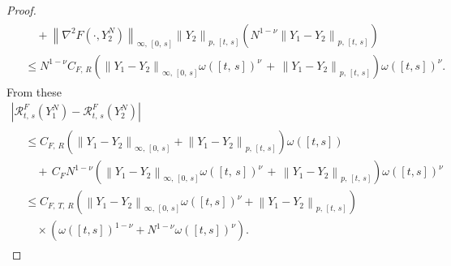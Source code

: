 \documentclass[10pt]{amsart}
\theoremstyle{definition}\newtheorem{defi}[theo]{Definition}\newtheorem{rema}[theo]{Remark}\newtheorem{exam}[theo]{Example}\newtheorem{exem}[theo]{Example}\newtheorem{nota}[theo]{Notation}
\newcommand{\calR}{\mathcal{R}}
\begin{document}
\begin{proof}
\begin{multline*}
\begin{aligned}
&\quad+\left\|\nabla^2 F\left(\cdot, Y^N_2\right)\right\|_{\infty,\,[0,\,s]} \left\|Y_2\right\|_{p,\, [t,\,s]} \left(N^{1-\nu}\left\|Y_1-Y_2\right\|_{p,\,[t,\,s]}\right)\\
&\leq N^{1-\nu}C_{F,\,R}\left(\left\|Y_1-Y_2\right\|_{\infty,\,[0,\,s]} \omega([t,\,s])^{\nu}\, +\,\left\|Y_1-Y_2\right\|_{p,\,[t,\,s]}\right) \omega([t,s])^{\nu}.
\end{aligned}
\end{multline*}
From these
\begin{multline}\label{chp3eq:rfyholder}
\left|\calR^{F}_{t,\,s}\left(Y^N_1\right)-\calR^{F}_{t,\,s}\left(Y^N_2\right)\right|\\
\begin{aligned}
&\leq C_{F,\,R}\left(\left\|Y_1-Y_2\right\|_{\infty,\,[0,\,s]} + \left\|Y_1-Y_2\right\|_{p,\,[t,\,s]}\right) \omega([t,s])\\
&\quad+\,C_F N^{1-\nu} \left(\left\|Y_1-Y_2\right\|_{\infty,\,[0,\,s]} \omega([t,\,s])^{\nu}\, +\,\left\|Y_1-Y_2\right\|_{p,\,[t,\,s]}\right) \omega([t,s])^{\nu}\\
&\leq C_{F,\,T,\,R}\left(\left\|Y_1-Y_2\right\|_{\infty,\,[0,\,s]} \omega([t,s])^{\nu}+\left\|Y_1-Y_2\right\|_{p,\,[t,\,s]}\right)\\
&\quad\times\left(\omega([t,s])^{1-\nu}+N^{1-\nu} \omega([t,s])^{\nu}\right).
\end{aligned}
\end{multline}


\end{proof}
\end{document}
